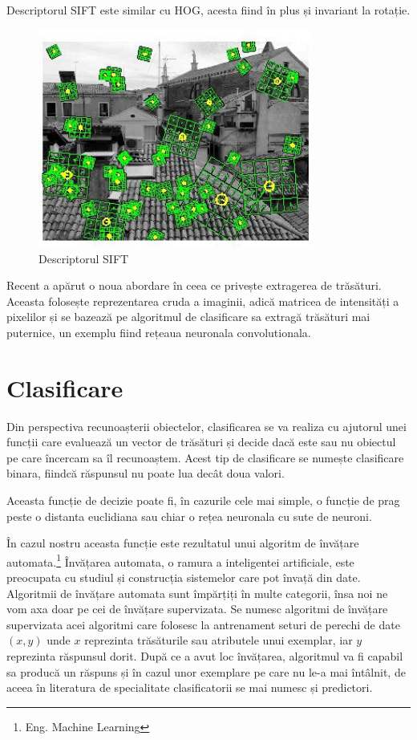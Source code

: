 Descriptorul SIFT este similar cu HOG, acesta fiind în plus și invariant la rotație.
\begin{figure}[H]
	\centering
		\includegraphics[width=0.80\textwidth]{imagini/sift0.jpg}
	\caption{Descriptorul SIFT\protect\footnotemark}
	\label{fig:sift}
\end{figure}

Recent a apărut o noua abordare în ceea ce privește extragerea de trăsături.
Aceasta folosește reprezentarea cruda a imaginii, adică matricea de intensități a pixelilor și se bazează pe algoritmul de clasificare sa extragă trăsături mai puternice, un exemplu fiind rețeaua neuronala convolutionala.\cite{lecun-98}

\section{Clasificare}

Din perspectiva recunoașterii obiectelor, clasificarea se va realiza cu ajutorul unei funcții care evaluează un vector de trăsături și decide dacă este sau nu obiectul pe care încercam sa îl recunoaștem. 
Acest tip de clasificare se numește clasificare binara, fiindcă răspunsul nu poate lua decât doua valori.

Aceasta funcție de decizie poate fi, în cazurile cele mai simple, o funcție de prag peste o distanta euclidiana sau chiar o rețea neuronala cu sute de neuroni.

În cazul nostru aceasta funcție este rezultatul unui algoritm de învățare automata.\footnote{Eng. Machine Learning}
Învățarea automata, o ramura a inteligentei artificiale, este preocupata cu studiul și construcția sistemelor care pot învață din date.
Algoritmii de învățare automata sunt împărțiți în multe categorii, însa noi ne vom axa doar pe cei de învățare supervizata.
Se numesc algoritmi de învățare supervizata acei algoritmi care folosesc la antrenament seturi de perechi de date ${(x,y)}$ unde ${x}$ reprezinta trăsăturile sau atributele unui exemplar, iar ${y}$ reprezinta răspunsul dorit. 
După ce a avut loc învățarea, algoritmul va fi capabil sa producă un răspuns și în cazul unor exemplare pe care nu le-a mai întâlnit, de aceea în literatura de specialitate clasificatorii se mai numesc și predictori.

